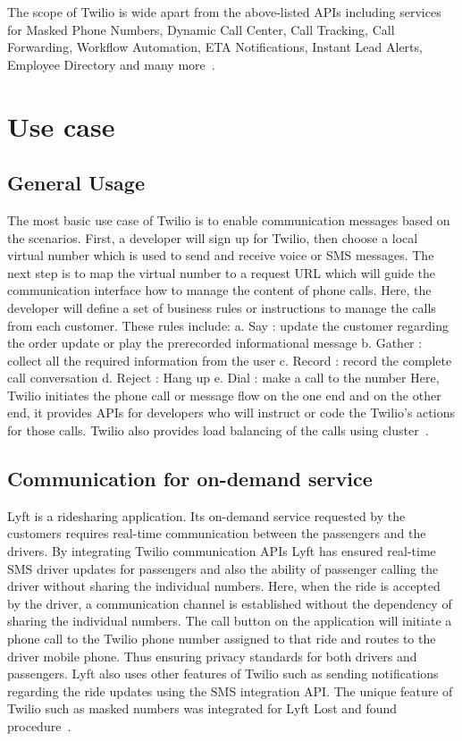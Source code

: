 The scope of Twilio is wide apart from the above-listed APIs including services 
for Masked Phone Numbers, Dynamic Call Center, Call Tracking, Call Forwarding, 
Workflow Automation, ETA Notifications, Instant Lead Alerts, Employee Directory
and many more~\cite{hid-sp18-406-twilio-architecture4}.
   
\section{Use case}
 
\subsection{General Usage}

The most basic use case of Twilio is to enable communication messages based on 
the scenarios. First, a developer will sign up for Twilio, then choose a local 
virtual number which is used to send and receive voice or SMS messages. The next
step is to map the virtual number to a request URL which will guide the 
communication interface how to manage the content of phone calls. Here, the 
developer will define a set of business rules or instructions to manage the 
calls from each customer. These rules include: 
a. Say : update the customer regarding the order update or play the prerecorded 
informational message 
b. Gather : collect all the required information from the user 
c. Record : record the complete call conversation 
d. Reject : Hang up 
e. Dial : make  a call to the number
Here, Twilio initiates the phone call or message flow on the one end and on the 
other end, it provides APIs for developers who will instruct or code the 
Twilio’s actions for those calls. Twilio also provides load balancing of the 
calls using cluster~\cite{hid-sp18-406-twilio-usecase1}.

\subsection{Communication for on-demand service}

Lyft is a ridesharing application. Its on-demand service requested by the 
customers requires real-time communication between the passengers and the 
drivers. By integrating Twilio communication APIs Lyft has ensured real-time 
SMS driver updates for passengers and also the ability of passenger calling the
driver without sharing the individual numbers. Here, when the ride is accepted 
by the driver, a communication channel is established without the dependency of
sharing the individual numbers. The call button on the application will 
initiate a phone call to the Twilio phone number assigned to that ride and 
routes to the driver mobile phone. Thus ensuring privacy standards for both
drivers and passengers. Lyft also uses other features of Twilio such as sending
notifications regarding the ride updates using the SMS integration API.  
The unique feature of Twilio such as masked numbers was integrated for Lyft 
Lost and found procedure~\cite{hid-sp18-406-twilio-usecase1}.

